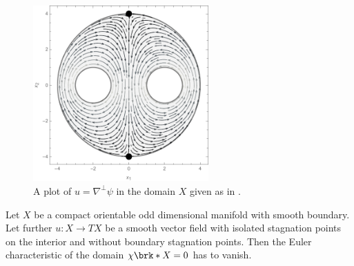 %   

\begin{frame}
  \begin{figure}
    \centering
    \includegraphics[width=0.6\textwidth]{../Plots/n2_hvf_roundRegion_InflowOutflow_gray_2.pdf}
    \caption{A plot of $u=\nabla^\perp\psi$ in the domain $X$ given as in \autocite[Ex.\ 6.9]{Koppenhoefer2024}.}
    \label{pl:n2_hvf_noInflowNoOutflow}
  \end{figure}
\end{frame}


\begin{frame}
  \begin{proposition}\label{pr:n3_domainCond}
    Let $X$ be a compact orientable odd dimensional manifold with smooth boundary.
    Let further $u\colon X\to TX$ be a smooth vector field with isolated stagnation points on the interior and without
    boundary stagnation points. Then the Euler characteristic of the domain $\chi\brk*{X}=0$ has to vanish.
  \end{proposition} 
\end{frame}

